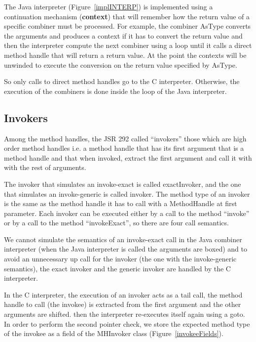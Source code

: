 \documentclass{sig-alternate}
\def \Jsr{JSR\xspace}
\def \JSR{\Jsr 292\xspace}
\begin{document}
      The Java interpreter (Figure~\ref{implINTERP}) is implemented using a continuation mechanism
      ({\bf context}) that will remember how the return value of a specific combiner must be processed.
      For example, the combiner AsType converts the arguments and produces a context if it has
      to convert the return value and then the interpreter compute the next combiner using a loop until it calls
      a direct method handle that will return a return value. At the point the contexts will be unwinded
      to execute the conversion on the return value specified by AsType. 

      So only calls to direct method handles go to the C interpreter.
      Otherwise, the execution of the combiners is done inside the loop of the Java interpreter.

    \subsection{Invokers}
     \label{invokers}

      Among the method handles, the \JSR called ``invokers'' those which are high order method handles i.e.
      a method handle that has its first argument that is a method handle and that when invoked,
      extract the first argument and call it with with the rest of arguments.

      The invoker that simulates an invoke-exact is called exactInvoker, and the one that simulates
      an invoke-generic is called invoker. The method type of an invoker is the same as the method handle
      it has to call with a MethodHandle at first parameter.
      Each invoker can be executed either by a call to the method ``invoke'' or by a call to the method ``invokeExact'',
      so there are four call semantics.
      
      We cannot simulate the semantics of an invoke-exact call in the Java combiner interpreter
      (when the Java interpreter is called the arguments are boxed) and to avoid an unnecessary up call
      for the invoker (the one with the invoke-generic semantics), the exact invoker and the generic invoker
      are handled by the C interpreter.
      
      In the C interpreter, the execution of an invoker acts as a tail call,
      the method handle to call (the invokee) is extracted from the first argument and the other arguments are shifted.
      then the interpreter re-executes itself again using a goto.
      In order to perform the second pointer check, we store the expected method type of the invokee as a field of the MHInvoker class
      (Figure~\ref{invokeeFields}).
\end{document}
